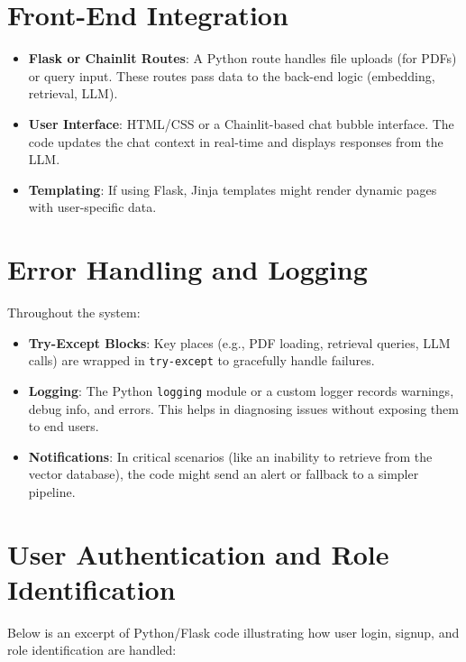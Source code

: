 \section{Front-End Integration}
\label{sec:frontend}
\begin{itemize}
    \item \textbf{Flask or Chainlit Routes}: A Python route handles file uploads (for PDFs) or query input. These routes pass data to the back-end logic (embedding, retrieval, LLM).
    \item \textbf{User Interface}: HTML/CSS or a Chainlit-based chat bubble interface. The code updates the chat context in real-time and displays responses from the LLM.
    \item \textbf{Templating}: If using Flask, Jinja templates might render dynamic pages with user-specific data.
\end{itemize}

\section{Error Handling and Logging}
\label{sec:error-logging}
Throughout the system:
\begin{itemize}
    \item \textbf{Try-Except Blocks}: Key places (e.g., PDF loading, retrieval queries, LLM calls) are wrapped in \texttt{try-except} to gracefully handle failures.
    \item \textbf{Logging}: The Python \texttt{logging} module or a custom logger records warnings, debug info, and errors. This helps in diagnosing issues without exposing them to end users.
    \item \textbf{Notifications}: In critical scenarios (like an inability to retrieve from the vector database), the code might send an alert or fallback to a simpler pipeline.
\end{itemize}

\section{User Authentication and Role Identification}
\label{sec:auth-role}

Below is an excerpt of Python/Flask code illustrating how user login, signup, and role identification are handled:

